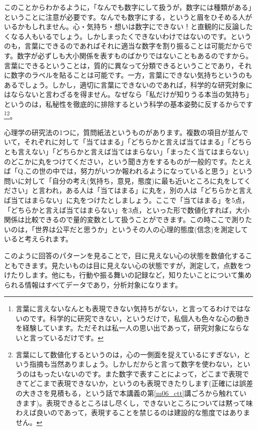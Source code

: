 \documentclass{ltjsbook}
\begin{document}
このことからわかるように，「なんでも数字にして扱うが，数字には種類がある」ということに注意が必要です。なんでも数字にする，というと眉をひそめる人がいるかもしれません。心・気持ち・想いは数字にできない！と直観的に反論したくなる人もいるでしょう。しかしまったくできないわけではないのです。というのも，言葉にできるのであればそれに適当な数字を割り振ることは可能だからです。数字が必ずしも大小関係を表すものばかりではないこともあるのですから。言葉にできるということは，質的に異なって分類できるということであり，それに数字のラベルを貼ることは可能です。一方，言葉にできない気持ちというのもあるでしょう。しかし，適切に言葉にできないのであれば，科学的な研究対象にはならないと言わざるを得ません。なぜなら「私だけが知りうる本当の気持ち」というのは，私秘性を徹底的に排除するという科学の基本姿勢に反するからです\footnote{言葉に言えないなんとも表現できない気持ちがない，と言ってるわけではないのです。科学的に研究できない，というだけで，私個人も色々な心の動きを経験しています。ただそれは私一人の思い出であって，研究対象にならないと言っているだけです。}\footnote{言葉にして数値化するというのは，心の一側面を捉えているにすぎない，という指摘も当然ありましょう。しかしだからと言って数字を使わない，というのはもったいないのです。また数字で表すことによって，どこまで表現できてどこまで表現できないか，というのも表現できたりします(正確には誤差の大きさを見積もる，という話で本講義の第\ref{m06_ctt}講ごろから触れていきます)。表現できるところはし尽くし，できないところについては黙って味わえば良いのであって，表現することを禁じるのは建設的な態度ではありません。}。

心理学の研究法の1つに，質問紙法というものがあります。複数の項目が並んでいて，それぞれに対して「当てはまる」「どちらかと言えば当てはまる」「どちらとも言えない」「どちらかと言えば当てはまらない」「まったく当てはまらない」のどこかに丸をつけてください，という聞き方をするものが一般的です。たとえば「Q.この世の中では，努力がいつか報われるようになっていると思う」という問いに対して「自分の考え(気持ち，意見，態度)に最も近いところに丸をしてください」と言われ，ある人は「当てはまる」に丸を，別の人は「どちらかと言えば当てはまらない」に丸をつけたとしましょう。ここで「当てはまる」を5点，「どちらかと言えば当てはまらない」を3点，といった形で数値化すれば，大小関係は比較できるので量的変数として扱うことができます。この時ここで測りたいのは，「世界は公平だと思うか」というその人の心理的態度(信念)を測定していると考えられます。

このように回答のパターンを見ることで，目に見えない心の状態を数値化することもできます。見たいものは目に見えない心の状態ですが，測定して，点数をつけたりします。他にも，行動や振る舞いの記録など，知りたいことについて集められる情報はすべてデータであり，分析対象になります。
\end{document}

